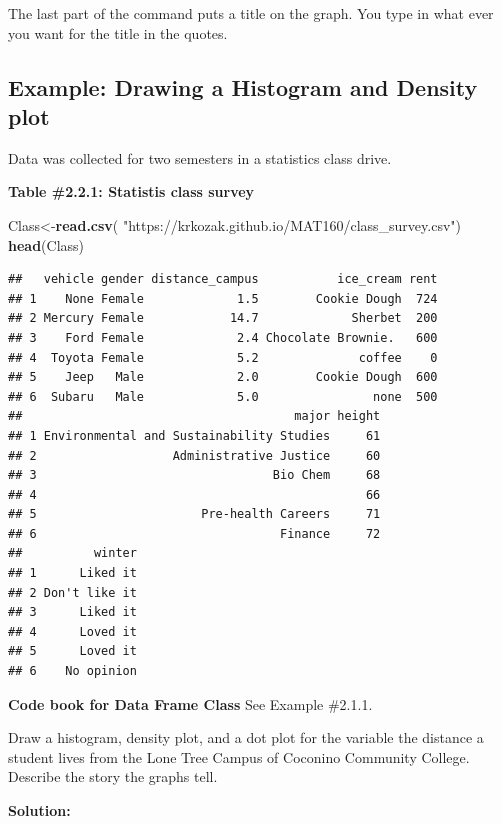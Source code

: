 \documentclass[
]{book}
\newenvironment{Shaded}{\begin{snugshade}}{\end{snugshade}}
\newcommand{\KeywordTok}[1]{\textcolor[rgb]{0.13,0.29,0.53}{\textbf{#1}}}
\newcommand{\NormalTok}[1]{#1}
\newcommand{\StringTok}[1]{\textcolor[rgb]{0.31,0.60,0.02}{#1}}
\begin{document}
The last part of the command puts a title on the graph. You type in what ever you want for the title in the quotes.

\hypertarget{example-drawing-a-histogram-and-density-plot}{%
\subsection{Example: Drawing a Histogram and Density plot}\label{example-drawing-a-histogram-and-density-plot}}

Data was collected for two semesters in a statistics class drive.

\textbf{Table \#2.2.1: Statistis class survey}

\begin{Shaded}
\begin{Highlighting}[]
\NormalTok{Class<-}\KeywordTok{read.csv}\NormalTok{(}
  \StringTok{"https://krkozak.github.io/MAT160/class_survey.csv"}\NormalTok{)}
\KeywordTok{head}\NormalTok{(Class)}
\end{Highlighting}
\end{Shaded}

\begin{verbatim}
##   vehicle gender distance_campus           ice_cream rent
## 1    None Female             1.5        Cookie Dough  724
## 2 Mercury Female            14.7             Sherbet  200
## 3    Ford Female             2.4 Chocolate Brownie.   600
## 4  Toyota Female             5.2              coffee    0
## 5    Jeep   Male             2.0        Cookie Dough  600
## 6  Subaru   Male             5.0                none  500
##                                      major height
## 1 Environmental and Sustainability Studies     61
## 2                   Administrative Justice     60
## 3                                 Bio Chem     68
## 4                                              66
## 5                       Pre-health Careers     71
## 6                                  Finance     72
##          winter
## 1      Liked it
## 2 Don't like it
## 3      Liked it
## 4      Loved it
## 5      Loved it
## 6    No opinion
\end{verbatim}

\textbf{Code book for Data Frame Class} See Example \#2.1.1.

Draw a histogram, density plot, and a dot plot for the variable the distance a student lives from the Lone Tree Campus of Coconino Community College. Describe the story the graphs tell.

\textbf{Solution:}
\end{document}
